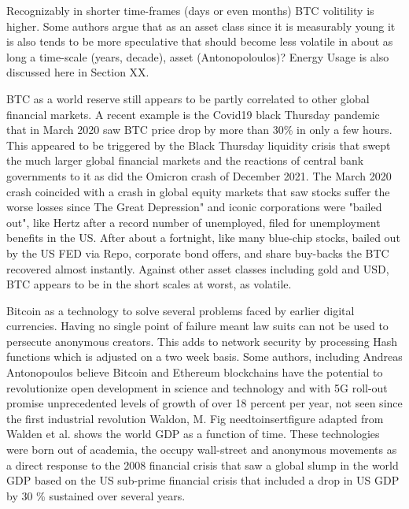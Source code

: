 \documentclass[final,5p,times,twocolumn,authoryear]{elsarticle}
\begin{document}
Recognizably in shorter time-frames (days or even months) BTC volitility is higher. Some authors argue that as an asset class since it is measurably young it is also tends to be more speculative that should become less volatile in about as long a time-scale (years, decade), asset (Antonopoloulos)? Energy Usage is also discussed here in Section XX. 
 
BTC as a world reserve still appears to be partly correlated to other global financial markets. A recent example is the Covid19 black Thursday pandemic that in March 2020 saw BTC price drop by more than 30\% in only a few hours. This appeared to be triggered by the Black Thursday liquidity crisis that swept the much larger global financial markets and the reactions of central bank governments to it as did the Omicron crash of December 2021. The March 2020 crash coincided with a crash in global equity markets that saw stocks suffer the worse losses since The Great Depression" and iconic corporations were "bailed out", like Hertz after a record number of unemployed, filed for unemployment benefits in the US. After about a fortnight, like many blue-chip stocks, bailed out by the US FED via Repo, corporate bond offers, and share buy-backs the BTC recovered almost instantly. Against other asset classes including gold and USD, BTC appears to be in the short scales at worst, as volatile. 
 
Bitcoin as a technology to solve several problems faced by earlier digital currencies. Having no single point of failure meant law suits can not be used to persecute anonymous creators. This adds to network security by processing Hash functions which is adjusted on a two week basis. Some authors, including Andreas Antonopoulos believe Bitcoin and Ethereum blockchains have the potential to revolutionize open development in science and technology and with 5G roll-out promise unprecedented levels of growth of over 18 percent per year, not seen since the first industrial revolution Waldon, M.  Fig needtoinsertfigure adapted from Walden et al. shows the world GDP as a function of time. These technologies were born out of academia, the occupy wall-street and anonymous movements as a direct response to the 2008 financial crisis that saw a global slump in the world GDP based on the US sub-prime financial crisis  that included a drop in US GDP by 30 \% sustained over several years.
 
\end{document}
